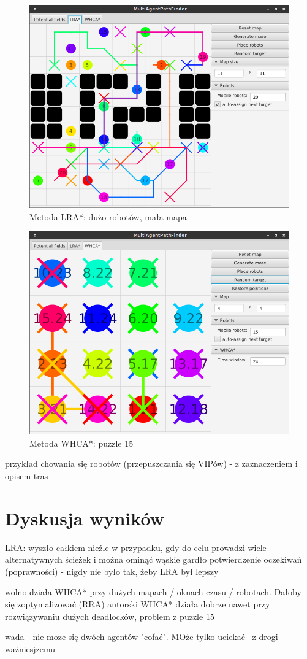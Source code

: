 \begin{figure}
	\centering
	\includegraphics[width=0.8\columnwidth]{img/robopath/lra-lot-robots}
	\caption{Metoda LRA*: dużo robotów, mała mapa}
	\label{fig:test-lra-lot-robots}
\end{figure}

\begin{figure}
	\centering
	\includegraphics[width=0.8\columnwidth]{img/robopath/puzzle-15}
	\caption{Metoda WHCA*: puzzle 15}
	\label{fig:test-puzzle-15}
\end{figure}

przykład chowania się robotów (przepuszczania się VIPów) - z zaznaczeniem i opisem tras

\section{Dyskusja wyników}
LRA: wyszło całkiem nieźle w przypadku, gdy do celu prowadzi wiele alternatywnych ścieżek i można ominąć wąskie gardło
potwierdzenie oczekiwań (poprawności) - nigdy nie było tak, żeby LRA był lepszy

wolno działa WHCA* przy dużych mapach / oknach czasu / robotach. Dałoby się zoptymalizować (RRA)
autorski WHCA* działa dobrze nawet przy rozwiązywaniu dużych deadlocków, problem z puzzle 15

wada - nie moze się dwóch agentów "cofać". MOże tylko uciekać  z drogi ważniesjzemu